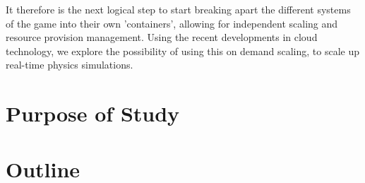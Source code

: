 It therefore is the next logical step to start breaking apart the different systems of the game into their own 'containers', allowing for independent scaling and resource provision management.  
Using the recent developments in cloud technology, we explore the possibility of using this on demand scaling, to scale up real-time physics simulations.


\section{Purpose of Study}
\section{Outline}
